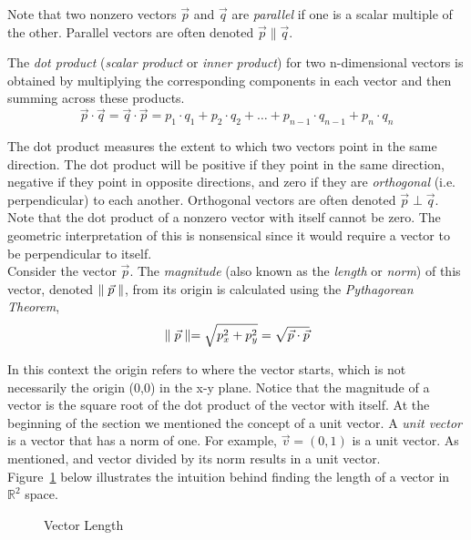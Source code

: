 \documentclass[12pt]{article}
\begin{document}
Note that two nonzero vectors $\vec{p}$ and $\vec{q}$ are \emph{parallel} if one is a scalar multiple of the other. Parallel vectors are often denoted $\vec{p}\parallel\vec{q}$.

The \emph{dot product} (\emph{scalar product} or \emph{inner product}) for two n-dimensional vectors is obtained by multiplying the corresponding components in each vector and then summing across these products. 
\[
\vec{p}\cdot \vec{q} = \vec{q}\cdot \vec{p} = p_1 \cdot q_1 + p_2 \cdot q_2 + \ldots + p_{n-1} \cdot q_{n-1} + p_n \cdot q_n
\]

The dot product measures the extent to which two vectors point in the same direction. The dot product will be positive if they point in the same direction, negative if they point in opposite directions, and zero if they are \emph{orthogonal} (i.e. perpendicular) to each another. Orthogonal vectors are often denoted $\vec{p}\perp\vec{q}$. Note that the dot product of a nonzero vector with itself cannot be zero. The geometric interpretation of this is nonsensical since it would require a vector to be perpendicular to itself. \\

Consider the vector $\vec{p}$. The \emph{magnitude} (also known as the \emph{length} or \emph{norm}) of this vector, denoted $\parallel\vec{p}\parallel$, from its origin is calculated using the \emph{Pythagorean Theorem},
\begin{align*}
\parallel\vec{p}\parallel = \sqrt{p_x^2+p_y^2} = \sqrt{\vec{p}\cdot\vec{p}}
\end{align*}

In this context the origin refers to where the vector starts, which is not necessarily the origin (0,0) in the x-y plane. Notice that the magnitude of a vector is the square root of the dot product of the vector with itself. At the beginning of the section we mentioned the concept of a unit vector. A \emph{unit vector} is a vector that has a norm of one. For example, $\vec{v}=(0,1)$ is a unit vector. As mentioned, and vector divided by its norm results in a unit vector. \\

Figure~\ref{fig:vectorlength} below illustrates the intuition behind finding the length of a vector in $\mathbb{R}^2$ space. \\

\begin{figure}[h!]
\centering
\caption{Vector Length}
\label{fig:vectorlength}
\end{figure}
\end{document}
